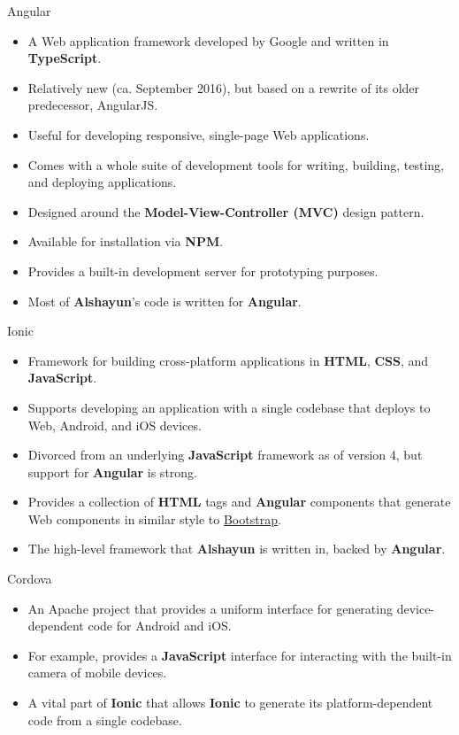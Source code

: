 \documentclass{beamer}
\begin{document}
\begin{frame}{Angular}
    \begin{itemize}
        \item A Web application framework developed by Google and written in
            \textbf{TypeScript}.
        \item Relatively new (ca. September 2016), but based on a rewrite of its
            older predecessor, AngularJS.
        \item Useful for developing responsive, single-page Web applications.
        \item Comes with a whole suite of development tools for writing,
            building, testing, and deploying applications.
        \item Designed around the \textbf{Model-View-Controller (MVC)} design
            pattern.
        \item Available for installation via \textbf{NPM}.
        \item Provides a built-in development server for prototyping purposes.
        \item Most of \textbf{Alshayun}'s code is written for \textbf{Angular}.
    \end{itemize}
\end{frame}

\begin{frame}{Ionic}
    \begin{itemize}
        \item Framework for building cross-platform applications in
            \textbf{HTML}, \textbf{CSS}, and \textbf{JavaScript}.
        \item Supports developing an application with a single codebase that
            deploys to Web, Android, and iOS devices.
        \item Divorced from an underlying \textbf{JavaScript} framework as of
            version 4, but support for \textbf{Angular} is strong.
        \item Provides a collection of \textbf{HTML} tags and \textbf{Angular}
            components that generate Web components in similar style to
            \href{https://getbootstrap.com/}{Bootstrap}.
        \item The high-level framework that \textbf{Alshayun} is written in,
            backed by \textbf{Angular}.
    \end{itemize}
\end{frame}

\begin{frame}{Cordova}
    \begin{itemize}
        \item An Apache project that provides a uniform interface for generating
            device-dependent code for Android and iOS.
        \item For example, provides a \textbf{JavaScript} interface for
            interacting with the built-in camera of mobile devices.
        \item A vital part of \textbf{Ionic} that allows \textbf{Ionic} to
            generate its platform-dependent code from a single codebase.
    \end{itemize}
\end{frame}
\end{document}
